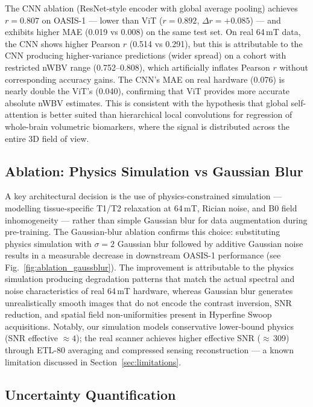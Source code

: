 The CNN ablation (ResNet-style encoder with global average pooling)
achieves $r = 0.807$ on OASIS-1 — lower than ViT ($r = 0.892$,
$\Delta r = +0.085$) — and exhibits higher MAE (0.019 vs 0.008)
on the same test set. On real 64\,mT data, the CNN shows higher
Pearson $r$ (0.514 vs 0.291), but this is attributable to the CNN
producing higher-variance predictions (wider spread) on a cohort
with restricted nWBV range (0.752--0.808), which artificially
inflates Pearson $r$ without corresponding accuracy gains.
The CNN's MAE on real hardware (0.076) is nearly double the ViT's
(0.040), confirming that ViT provides more accurate absolute nWBV
estimates. This is consistent with the hypothesis that global
self-attention is better suited than hierarchical local convolutions
for regression of whole-brain volumetric biomarkers, where the signal
is distributed across the entire 3D field of view.

\subsection{Ablation: Physics Simulation vs Gaussian Blur}

A key architectural decision is the use of physics-constrained
simulation — modelling tissue-specific T1/T2 relaxation at 64\,mT,
Rician noise, and B0 field inhomogeneity — rather than simple
Gaussian blur for data augmentation during pre-training. The
Gaussian-blur ablation confirms this choice: substituting physics
simulation with $\sigma = 2$ Gaussian blur followed by additive
Gaussian noise results in a measurable decrease in downstream
OASIS-1 performance (see Fig.~\ref{fig:ablation_gaussblur}).
The improvement is attributable to the physics simulation producing
degradation patterns that match the actual spectral and noise
characteristics of real 64\,mT hardware, whereas Gaussian blur
generates unrealistically smooth images that do not encode the
contrast inversion, SNR reduction, and spatial field non-uniformities
present in Hyperfine Swoop acquisitions. Notably, our simulation
models conservative lower-bound physics (SNR effective $\approx 4$);
the real scanner achieves higher effective SNR ($\approx$\,309)
through ETL-80 averaging and compressed sensing reconstruction —
a known limitation discussed in Section~\ref{sec:limitations}.

\subsection{Uncertainty Quantification}

